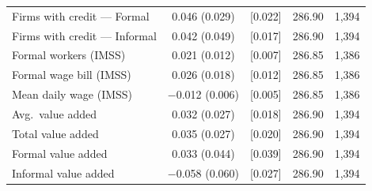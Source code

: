 \begin{threeparttable}
\begin{tabular}{lcccr}
        Firms with credit --- Formal    & \phantom{$-$}0.046          (0.029) & [0.022]\sym{**}  & 286.90 & 1{,}394 \\
        Firms with credit --- Informal  & \phantom{$-$}0.042          (0.049) & [0.017]\sym{**}  & 286.90 & 1{,}394 \\
        \midrule
        Formal workers (IMSS)           & \phantom{$-$}0.021\sym{*}   (0.012) & [0.007]\sym{***} & 286.85 & 1{,}386 \\
        Formal wage bill (IMSS)         & \phantom{$-$}0.026          (0.018) & [0.012]\sym{**}  & 286.85 & 1{,}386 \\
        Mean daily wage (IMSS)          & $-$0.012\sym{**}  (0.006) & [0.005]\sym{**}  & 286.85 & 1{,}386 \\
        Avg.\ value added               & \phantom{$-$}0.032          (0.027) & [0.018]\sym{*}   & 286.90 & 1{,}394 \\
        Total value added               & \phantom{$-$}0.035          (0.027) & [0.020]\sym{*}   & 286.90 & 1{,}394 \\
        Formal value added              & \phantom{$-$}0.033          (0.044) & [0.039]          & 286.90 & 1{,}394 \\
        Informal value added            & $-$0.058          (0.060) & [0.027]\sym{**}  & 286.90 & 1{,}394 \\
        \bottomrule
    \end{tabular}
    \begin{tablenotes}[flushleft]
        \footnotesize

\end{tablenotes}
\end{threeparttable}
